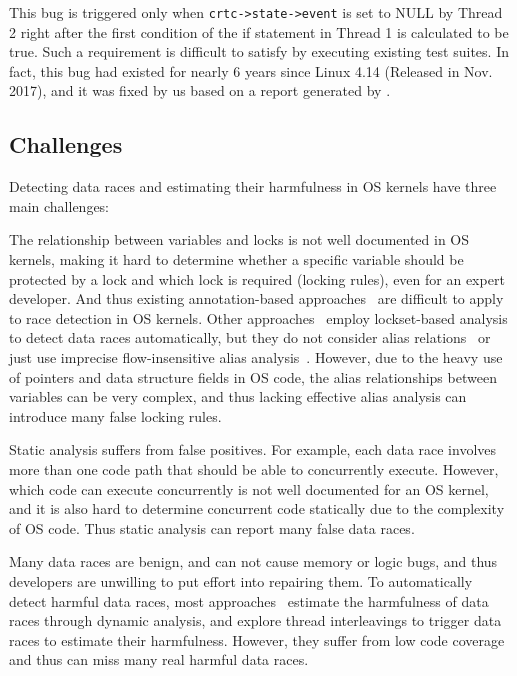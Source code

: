 This bug is triggered only when {\tt crtc->state->event} is set to NULL by 
Thread 2 right after the first condition of the if statement in Thread 1 is 
calculated to be true. Such a requirement is difficult to satisfy by executing 
existing test suites. In fact, this bug had existed for nearly 6 years since 
Linux 4.14 (Released in Nov. 2017), and it was fixed by us based on a report 
generated by \sys. 
 
\subsection{Challenges}
\label{subsec_challenges}
Detecting data races and estimating their harmfulness in OS kernels have three 
main challenges:

 The relationship between variables and locks 
is not well documented in OS kernels, making it hard to determine whether a 
specific variable should be protected by a lock and which lock is 
required (locking rules), even for an expert developer. And thus existing 
annotation-based approaches~\cite{Boyapati:OOPSLA02, Anderson:PLDI08, 
Anderson:PLDI09, Zhou:MICRO19, Flanagan:PASTE01, Flanagan:PLDI00, 
Sadowski:PLATEAU14, ClangThreadSafety, Blackshear:OOPSLA18} are difficult to 
apply to race detection in OS kernels. Other approaches~\cite{Choi:PLDI02, 
Engler:SOSP03, Voung:FSE07, Pratikakis:PLDI06, Naik:PLDI06} employ 
lockset-based analysis to detect data races automatically, but they do not 
consider alias relations~\cite{Voung:FSE07, Engler:SOSP03} or just use 
imprecise flow-insensitive alias analysis~\cite{Choi:PLDI02, 	
Pratikakis:PLDI06, Naik:PLDI06}. However, due to the heavy use of pointers and 
data structure fields in OS code, the alias relationships between variables can 
be very complex, and thus lacking effective alias analysis can introduce many 
false locking rules.

 Static analysis suffers from false 
positives. For example, each data race involves more than one code path that 
should be able to concurrently execute. However, which code can execute 
concurrently is not well documented for an OS kernel, and it is also hard to 
determine concurrent code statically due to the complexity of OS code. Thus 
static analysis can report many false data races.

 Many data races are benign, and 
can not cause memory or logic bugs, and thus developers are unwilling to put 
effort into repairing them. To automatically detect harmful data races, most 
approaches~\cite{Narayanasamy:PLDI07, Sen:PLDI08, Kasikci:SOSP13, 
Kasikci:ASPLOS12} estimate the harmfulness of data races through dynamic 
analysis, and explore thread interleavings to trigger data races to estimate 
their harmfulness. However, they suffer from low code coverage and thus can 
miss many real harmful data races.


